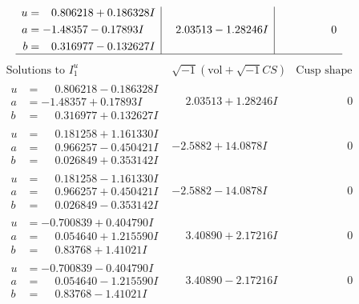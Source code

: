 \documentclass[1p]{elsarticle_modified}
\theoremstyle{definition}
\newcommand{\I}{\sqrt{-1}}
\begin{document}
$$\begin{array}{c|c|c}
\begin{aligned}
u &= \phantom{-}0.806218 + 0.186328 I \\
a &= -1.48357 - 0.17893 I \\
b &= \phantom{-}0.316977 - 0.132627 I\end{aligned}
 & \phantom{-}2.03513 - 1.28246 I & \phantom{-0.000000 } 0\\
 \hline 
 \end{array}$$\newpage$$\begin{array}{c|c|c}  
\text{Solutions to }I^u_{1}& \I (\text{vol} + \sqrt{-1}CS) & \text{Cusp shape}\\
 \hline 
\begin{aligned}
u &= \phantom{-}0.806218 - 0.186328 I \\
a &= -1.48357 + 0.17893 I \\
b &= \phantom{-}0.316977 + 0.132627 I\end{aligned}
 & \phantom{-}2.03513 + 1.28246 I & \phantom{-0.000000 } 0 \\ \hline\begin{aligned}
u &= \phantom{-}0.181258 + 1.161330 I \\
a &= \phantom{-}0.966257 - 0.450421 I \\
b &= \phantom{-}0.026849 + 0.353142 I\end{aligned}
 & -2.5882 + 14.0878 I & \phantom{-0.000000 } 0 \\ \hline\begin{aligned}
u &= \phantom{-}0.181258 - 1.161330 I \\
a &= \phantom{-}0.966257 + 0.450421 I \\
b &= \phantom{-}0.026849 - 0.353142 I\end{aligned}
 & -2.5882 - 14.0878 I & \phantom{-0.000000 } 0 \\ \hline\begin{aligned}
u &= -0.700839 + 0.404790 I \\
a &= \phantom{-}0.054640 + 1.215590 I \\
b &= \phantom{-}0.83768 + 1.41021 I\end{aligned}
 & \phantom{-}3.40890 + 2.17216 I & \phantom{-0.000000 } 0 \\ \hline\begin{aligned}
u &= -0.700839 - 0.404790 I \\
a &= \phantom{-}0.054640 - 1.215590 I \\
b &= \phantom{-}0.83768 - 1.41021 I\end{aligned}
 & \phantom{-}3.40890 - 2.17216 I & \phantom{-0.000000 } 0 \\ \hline\begin{aligned}

\end{aligned}
\end{array}$$
\end{document}
